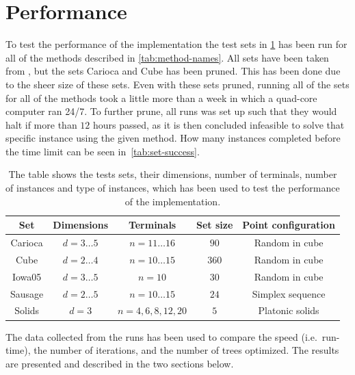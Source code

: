 \section{Performance}
\label{sec:performance}

To test the performance of the implementation the test sets in
\cref{tab:test-sets} has been run for all of the methods described in
\cref{tab:method-names}. All sets have been taken from \textcite{fonseca2014},
but the sets Carioca and Cube has been pruned. This has been done due to the
sheer size of these sets. Even with these sets pruned, running all of the sets
for all of the methods took a little more than a week in which a quad-core
computer ran 24/7. To further prune, all runs was set up such that they would
halt if more than $12$ hours passed, as it is then concluded infeasible to solve
that specific instance using the given method. How many instances completed
before the time limit can be seen in~\cref{tab:set-success}.
%
\begin{table}[htbp]
  \centering
  \begin{tabular}{ccccc}
    \toprule
    Set     & Dimensions       & Terminals             & Set size & Point configuration \\
    \midrule
    Carioca & $d = 3 \ldots 5$ & $n = 11 \ldots 16$    & $90$     & Random in cube      \\
    Cube    & $d = 2 \ldots 4$ & $n = 10 \ldots 15$    & $360$    & Random in cube      \\
    Iowa05  & $d = 3 \ldots 5$ & $n = 10$              & $30$     & Random in cube      \\
    Sausage & $d = 2 \ldots 5$ & $n = 10 \ldots 15$    & $24$     & Simplex sequence    \\
    Solids  & $d = 3$          & $n = 4, 6, 8, 12, 20$ & $5$      & Platonic solids     \\
    \bottomrule
  \end{tabular}
  \caption[Test sets used to test performance]{The table shows the tests sets,
    their dimensions, number of terminals, number of instances and type of instances,
    which has been used to test the performance of the implementation.\label{tab:test-sets}}
\end{table}
%
The data collected from the runs has been used to compare the speed (i.e.\
run-time), the number of iterations, and the number of trees optimized. The
results are presented and described in the two sections below.
%

